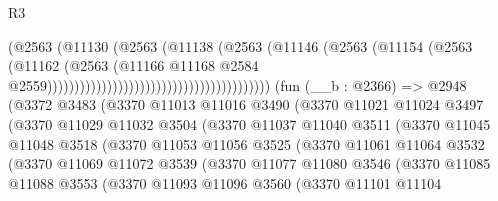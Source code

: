 \begin{lexlean}{R3}
\begin{coremodule}
                                                              (@2563
                                                                (@11130
                                                                  (@2563
                                                                    (@11138
                                                                      (@2563
                                                                        (@11146
                                                                          (@2563
                                                                            (@11154
                                                                              (@2563
                                                                                (@11162
                                                                                  (@2563
                                                                                    (@11166
                                                                                      @11168
                                                                                      @2584
                                                                                      @2559)))))))))))))))))))))))))))))))))))))))))
    (fun (__b : @2366) =>
    @2948
      (@3372
        @3483
        (@3370
          @11013
          @11016
          @3490
          (@3370
            @11021
            @11024
            @3497
            (@3370
              @11029
              @11032
              @3504
              (@3370
                @11037
                @11040
                @3511
                (@3370
                  @11045
                  @11048
                  @3518
                  (@3370
                    @11053
                    @11056
                    @3525
                    (@3370
                      @11061
                      @11064
                      @3532
                      (@3370
                        @11069
                        @11072
                        @3539
                        (@3370
                          @11077
                          @11080
                          @3546
                          (@3370
                            @11085
                            @11088
                            @3553
                            (@3370
                              @11093
                              @11096
                              @3560
                              (@3370
                                @11101
                                @11104

\end{coremodule}
\end{lexlean}
